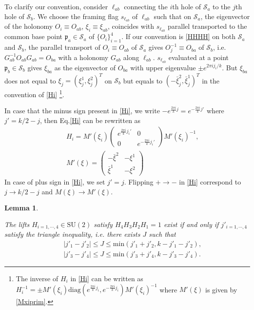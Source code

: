 \documentclass[aps,prd,notitlepage,nofootinbib,superscriptaddress,groupedaddress,twocolumn]{revtex4-1}
\newtheorem{lemma}[theorem]{Lemma}
\newcommand{\Su}{\mathrm{SU}(2)}
\def\be{\begin{eqnarray}}
\def\ee{\end{eqnarray}}
\newcommand{\cs}{\mathcal S}
\newcommand{\fp}{\mathfrak{p}}  \newcommand{\Fp}{\mathfrak{P}}
\newcommand{\lt}{\left}
\newcommand{\rt}{\right}
\begin{document}
To clarify our convention, consider $\ell_{ab}$ connecting the $i$th hole of $\cs_a$ to the $j$th hole of $\cs_b$. We choose the framing flag $s_{\ell_{ab}}$ of $\ell_{ab}$ such that on $\cs_a$, the eigenvector of the holonomy $O_i\equiv O_{ab}$, $\xi_i\equiv \xi_{ab}$, coincides with $s_{\ell_{ab}}$ parallel transported to the common base point $\fp_a\in\cs_a$ of $\{O_i\}_{i=1}^4$. If our convention is \eqref{HHHH} on both $\cs_a$ and $\cs_b$, the parallel transport of $O_i\equiv O_{ab}$ of $\cs_a$ gives $O_j^{-1}\equiv O_{ba}$ of $\cs_b$, i.e. $G_{ab}^{-1}O_{ab}G_{ab}=O_{ba}$ with a holonomy $G_{ab}$ along $\ell_{ab}$. $s_{\ell_{ab}}$ evaluated at a point $\fp_b\in\cs_b$ gives $\xi_{ba}$ as the eigenvector of $O_{ba}$ with upper eigenvalue $\pm e^{2\pi i j_i/k}$. But $\xi_{ba}$ does not equal to $\xi_j=(\xi_j^1,\xi_j^2)^T$ on $\cs_b$ but equals to $(-\bar{\xi}_j^2,\bar{\xi}_j^1)^T$ in the convention of \eqref{Hi} \footnote{The inverse of $H_i$ in \eqref{Hi} can be written as $H_i^{-1}= \pm M'(\xi_i)\mathrm{diag}(e^{\frac{2\pi i}{k}j_i}, e^{-\frac{2\pi i}{k}j_i})M'(\xi_i)^{-1}$ where $M'(\xi)$ is given by \eqref{Mxiprim}.}. 





In case that the minus sign present in \eqref{Hi}, we write $-e^{\frac{2\pi i}{k}j}=e^{-\frac{2\pi i}{k}j'}$ where $j'=k/2-j$, then Eq.\eqref{Hi} can be rewritten as
\be
&&H_i= M'(\xi_i)\left(\begin{array}{cc}
	 e^{\frac{2\pi i}{k}j_i'} & 0 \\
  0 & e^{-\frac{2\pi i}{k}j_i'}
  \end{array}\right)M'(\xi_i)^{-1},\label{Hiprim}\\
&&M'(\xi)=\left(\begin{array}{cc}
	-\bar{\xi}^2 &-\xi^1  \\
	\bar{\xi}^1 & -\xi^2 
	\end{array}\right)\label{Mxiprim}
\ee
In case of plus sign in \eqref{Hi}, we set $j'=j$. Flipping $+\to -$ in \eqref{Hi} correspond to $j\to k/2-j$ and $M(\xi)\to M'(\xi)$.

\begin{lemma}\label{trianineq}

The lifts $H_{i=1,\cdots,4}\in\Su$ satisfy $H_4H_3H_2H_1=1$ exist if and only if $j'_{i=1,\cdots,4}$ satisfy the triangle inequality, i.e. there exists $J$ such that
\be
&&|j'_1-j'_2|\leq J\leq \mathrm{min}\lt(j'_1+j'_2,k-j'_1-j'_2\rt),\label{trigineq1}\\
&&|j'_3-j'_4|\leq J\leq \mathrm{min}\lt(j'_3+j'_4, k-j'_3-j'_4\rt).\label{trigineq2}
\ee


\end{lemma}
\end{document}
